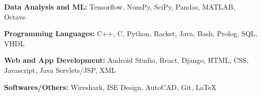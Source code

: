 \begin{cventries}
  \cventry
    {}
    {}
    {}
    {}
    {
    \vspace{-0.4cm}
      \begin{cvitems}
        \item{\textbf{Data Analysis and ML:} \hspace{14.5mm}  Tensorflow, NumPy, SciPy, Pandas, MATLAB, Octave}
        \vspace{0.35mm}
        \item {\textbf{Programming Languages:} \hspace{0.9cm} C++, C, Python, Racket, Java, Bash, Prolog, SQL, VHDL}
        \vspace{0.35mm}
        \item{\textbf{Web and App Development:} \hspace{4mm} Android Studio, React, Django, HTML, CSS, Javascript, Java Servlets/JSP, XML}
        \vspace{0.35mm}
        \item{\textbf{Softwares/Others:}  \hspace{2cm}  Wireshark, ISE Design, AutoCAD, Git, \LaTeX}
      \end{cvitems}
    }
\end{cventries}